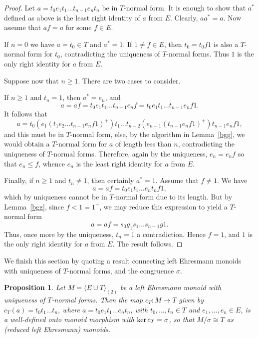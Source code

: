 \documentclass[12pt]{amsart}
\newtheorem{prop}[them]{Proposition}
\theoremstyle{definition}
\theoremstyle{definition}
\numberwithin{them}{section}
\numberwithin{equation}{section}
\begin{document}
\begin{proof} Let
$a=t_0e_1t_1\dots t_{n-1}e_{n}t_n$ be in $T$-normal form. It is enough to show that $a^*$ defined as above is  the least right identity of $a$ from $E$. Clearly, $aa^*=a$.
Now assume that $af = a$ for some $f \in E$.


If $n=0$  we have $a=t_0\in T$ and $a^*=1$. If $1 \neq f \in E$, then $t_0=t_0f1$ is also a $T$-normal form for $t_0$, contradicting the uniqueness of  $T$-normal forms. Thus $1$  is the only right identity for $a$ from $E$.


Suppose now that $n\geq 1$. There are two cases to consider.

If $n\geq 1$ and $t_n=1$, then  $a^*=e_n$, and  
\[a=af =t_0e_1t_1\dots t_{n-1}e_{n}f=t_0e_1t_1\dots t_{n-1}e_{n}f1.\]
It follows that \[ a=t_0(e_1(t_1e_2\dots t_{n-1}e_nf1)^+) t_1 \dots t_{n-2}(e_{n-1}(t_{n-1}e_nf1)^+)t_{n-1}e_nf1,\]
and this must be in $T$-normal form, else, 
by  the algorithm in  Lemma~\ref{bgg},
 we would obtain a $T$-normal form for $a$  of length less than $n$, contradicting the 
uniqueness of $T$-normal forms. Therefore, again by the uniqueness,
$e_n=e_nf$ so that $e_n\leq f$, whence $e_n$ is the least right identity for $a$ from $E$. 


Finally, if $n\geq 1$ and $t_n\neq 1$, then certainly $a^*=1$.  Assume that  $f \neq 1$. We have
$$a=af =t_0e_1t_1\dots e_{n}t_nf1,$$
which by uniqueness cannot be in  $T$-normal form due to its length. But  by Lemma~\ref{bgg}, since $f<1=1^+$,  we may reduce this expression to yield a $T$-normal form 
\[a=af=s_0g_1s_1\dots s_{n-1}g1.\]
Thus, once more by the uniqueness, $t_n=1$ a contradiction. Hence  $f=1$, and $1$  is the only right identity for $a$ from $E$. The result follows. 
\end{proof}



 We finish this section by quoting a result connecting left Ehresmann monoids with uniqueness of $T$-normal forms, and the congruence $\sigma$. 


\begin{prop}\cite[Proposition 3.4]{BGG}\label{M/Sigma-T} 
 Let $M = \langle E\cup T\rangle_{(2)}$ be a left Ehresmann monoid with uniqueness of $T$-normal forms. Then the map $c_{T}: M \rightarrow T$ given by $c_T(a) = t_0t_1\dots t_n$, where $a = t_0e_1t_1\dots e_nt_n$, with $t_0, \dots, t_n \in T$ and $e_1, \dots, e_n \in E$, is a well-defined onto monoid morphism with ${\rm ker}\, c_T = \sigma$,  so that $M/\sigma \cong T$ as (reduced left Ehresmann) monoids.
\end{prop}
\end{document}
